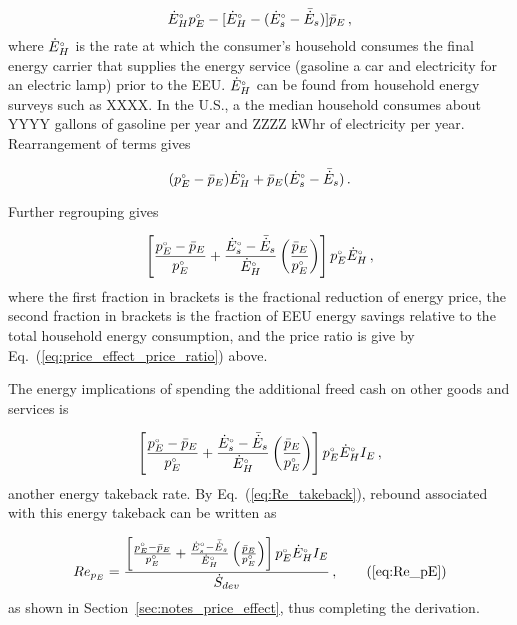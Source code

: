 \begin{equation}
  {}{\dot{E}}^{\scriptscriptstyle \circ}_H {}{p}^{\scriptscriptstyle \circ}_E - [{}{\dot{E}}^{\scriptscriptstyle \circ}_H - ({}{\dot{E}}^{\scriptscriptstyle \circ}_s - \bar{\dot{E}}_s)] \bar{p}_E \, ,
\end{equation}
%
where ${}{\dot{E}}^{\scriptscriptstyle \circ}_H$ is the rate at which the consumer's household 
consumes the final energy carrier that supplies
the energy service
(gasoline a car and
electricity for an electric lamp) 
prior to the EEU.
${}{\dot{E}}^{\scriptscriptstyle \circ}_H$ can be found from household energy surveys
such as XXXX.
In the U.S.,
a the median household consumes about
YYYY gallons of gasoline per year and 
ZZZZ kWhr of electricity per year.
Rearrangement of terms gives

\begin{equation}
  ({}{p}^{\scriptscriptstyle \circ}_E - \bar{p}_E) {}{\dot{E}}^{\scriptscriptstyle \circ}_H + \bar{p}_E ({}{\dot{E}}^{\scriptscriptstyle \circ}_s - \bar{\dot{E}}_s) \, .
\end{equation}

Further regrouping gives

\begin{equation}
  \left[ \frac{{}{p}^{\scriptscriptstyle \circ}_E - \bar{p}_E}{{}{p}^{\scriptscriptstyle \circ}_E}
         + \frac{{}{\dot{E}}^{\scriptscriptstyle \circ}_s - \bar{\dot{E}}_s}{{}{\dot{E}}^{\scriptscriptstyle \circ}_H} 
              \left( \frac{\bar{p}_E}{{}{p}^{\scriptscriptstyle \circ}_E} \right) \right] 
                             {}{p}^{\scriptscriptstyle \circ}_E {}{\dot{E}}^{\scriptscriptstyle \circ}_H \, ,
\end{equation}
%
where the first fraction in brackets is the fractional reduction 
of energy price, 
the second fraction in brackets is the fraction of
EEU energy savings relative to
the total household energy consumption, and 
the price ratio is give by Eq.~(\ref{eq:price_effect_price_ratio}) above.

The energy implications of spending the additional freed cash
on other goods and services is

\begin{equation}
  \left[ \frac{{}{p}^{\scriptscriptstyle \circ}_E - \bar{p}_E}{{}{p}^{\scriptscriptstyle \circ}_E}
         + \frac{{}{\dot{E}}^{\scriptscriptstyle \circ}_s - \bar{\dot{E}}_s}{{}{\dot{E}}^{\scriptscriptstyle \circ}_H} 
              \left( \frac{\bar{p}_E}{{}{p}^{\scriptscriptstyle \circ}_E} \right) \right] 
                             {}{p}^{\scriptscriptstyle \circ}_E {}{\dot{E}}^{\scriptscriptstyle \circ}_H I_E \, ,
\end{equation}
%
another energy takeback rate.
By Eq.~(\ref{eq:Re_takeback}),
rebound associated with this energy takeback
can be written as

\begin{equation}
  Re_{p_E} = \frac{\left[ \frac{\orig{p}_E - \ainc{p}_E}{\orig{p}_E}
         + \frac{\rorig{E}_s - \rainc{E}_s}{\rorig{E}_H} 
              \left( \frac{\ainc{p}_E}{\orig{p}_E} \right) \right] 
                             \orig{p}_E \rorig{E}_H I_E}{\Sdot} \, , \tag{\ref{eq:Re_pE}}
\end{equation}
%
as shown in Section~\ref{sec:notes_price_effect},
thus completing the derivation.




